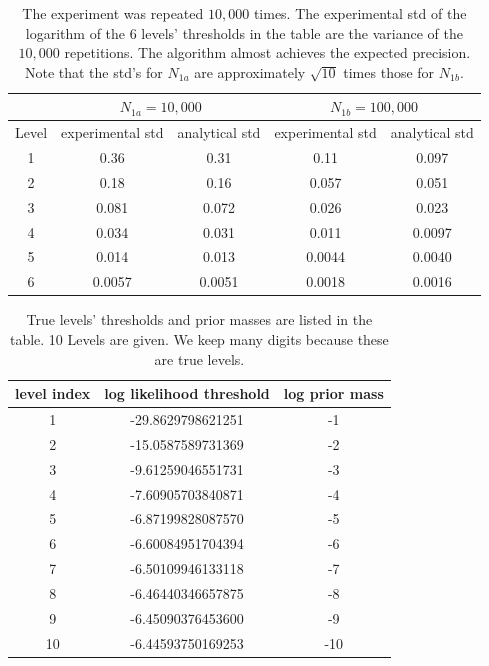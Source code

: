 \documentclass[letterpaper, preprint]{aastex}
\begin{document}
\begin{table}[h]
\centering
\begin{tabular}{c|c|c|c|c}
\hline
& \multicolumn{2}{|c|}{$N_{1a}=10,000$} & \multicolumn{2}{|c}{$N_{1b}=100,000$}\\
\hline
Level & experimental std & analytical std & experimental std & analytical std\\
\hline
1 & 0.36 & 0.31 &0.11 & 0.097\\
2 & 0.18 & 0.16 &0.057 & 0.051\\
3 & 0.081 & 0.072 &0.026 & 0.023\\
4 & 0.034 & 0.031 &0.011 & 0.0097\\
5 & 0.014 & 0.013 &0.0044 & 0.0040\\
6 & 0.0057 & 0.0051 &0.0018 & 0.0016\\
\hline
\end{tabular}
\caption{The experiment was repeated $10,000$ times. The experimental std of the logarithm of the 6 levels' thresholds in the table are the variance of the $10,000$ repetitions. The algorithm almost achieves the expected precision. Note that the std's for $N_{1a}$ are approximately $\sqrt{10}$ times those for $N_{1b}$.}
\label{tab:threshold-variance}
\end{table} 

\begin{table}[h]
\centering
\begin{tabular}{c|c|c}
\hline
level index & log likelihood threshold & log prior mass\\
\hline
1 & -29.8629798621251 & -1\\
2 & -15.0587589731369 & -2\\
3 & -9.61259046551731 & -3\\
4 & -7.60905703840871 & -4\\
5 & -6.87199828087570  & -5\\
6 & -6.60084951704394 & -6\\
7 & -6.50109946133118 & -7\\
8 & -6.46440346657875 & -8\\
9 & -6.45090376453600  & -9\\
10 &-6.44593750169253 & -10\\
\hline
\end{tabular}
\caption{True levels' thresholds and prior masses are listed in the table. 10 Levels are given. We keep many digits because these are true levels.}
\label{tab:true-levels}
\end{table} 
\end{document}
